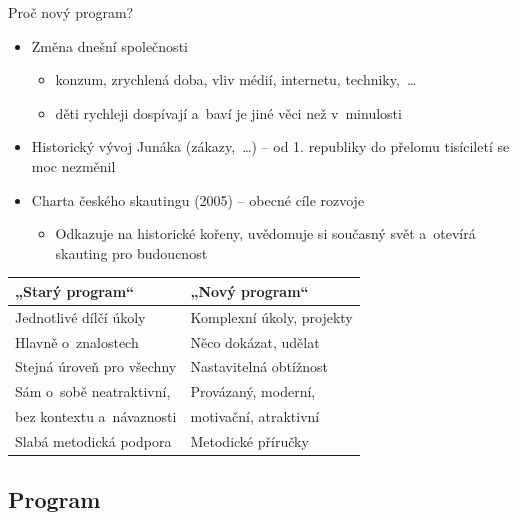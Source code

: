 \documentclass[compress,xelatex,xcolor=dvipsnames,print]{beamer}
\begin{document}
\begin{frame}{Proč nový program?}
\begin{itemize}
\item Změna dnešní společnosti
 \begin{itemize}
 \item konzum, zrychlená doba, vliv médií, internetu, techniky,~\ldots
 \item děti rychleji dospívají a~baví je jiné věci než v~minulosti
 \end{itemize}
\item Historický vývoj Junáka (zákazy,~\ldots) -- od 1. republiky do přelomu tisíciletí se moc nezměnil
\item Charta českého skautingu (2005) -- obecné cíle rozvoje
 \begin{itemize}
 \item Odkazuje na historické kořeny, uvědomuje si současný svět a~otevírá skauting pro budoucnost
 \end{itemize}
\end{itemize}
\begin{center}
\begin{tabular}{| l | l |}
\hline
{\textbf{„Starý program“}} & {\textbf{„Nový program“}}\\
\hline
Jednotlivé dílčí úkoly & Komplexní úkoly, projekty\\
\hline
Hlavně o~znalostech & Něco dokázat, udělat\\
\hline
Stejná úroveň pro všechny & Nastavitelná obtížnost\\
\hline
Sám o~sobě neatraktivní, & Provázaný, moderní,\\
bez kontextu a~návaznosti & motivační, atraktivní\\
\hline
Slabá metodická podpora & Metodické příručky\\
\hline
\end{tabular}
\end{center}
\end{frame}

\subsection{Program}
\end{document}
